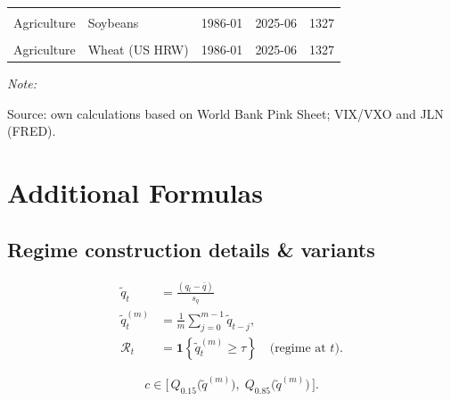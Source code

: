 \documentclass[
  11pt,
]{article}
\begin{document}
\begin{table}[!h]
{\begin{threeparttable}
\begin{tabular}[t]{llllr}
\cellcolor{gray!10}{Agriculture} & \cellcolor{gray!10}{Maize} & \cellcolor{gray!10}{1986-01} & \cellcolor{gray!10}{2025-06} & \cellcolor{gray!10}{1327}\\
\addlinespace
Agriculture & Soybeans & 1986-01 & 2025-06 & 1327\\
\cellcolor{gray!10}{Agriculture} & \cellcolor{gray!10}{Sugar (World)} & \cellcolor{gray!10}{1986-01} & \cellcolor{gray!10}{2025-06} & \cellcolor{gray!10}{1327}\\
Agriculture & Wheat (US HRW) & 1986-01 & 2025-06 & 1327\\
\bottomrule
\end{tabular}
\begin{tablenotes}
\item \textit{Note: } 
\item Source: own calculations based on World Bank Pink Sheet; VIX/VXO and JLN (FRED).
\end{tablenotes}
\end{threeparttable}}
\end{table}

\FloatBarrier
\clearpage

\section{Additional Formulas}\label{app-formulas}

\subsection{Regime construction details \& variants}\label{regime-construction-details-variants}

\begin{subequations}\label{eq:tilde-q-t-2}
\begin{align}
\tilde{q}_t &= \frac{(q_t - \bar{q})}{s_q}\, \label{eq:tilde-q-level-2}\\
\tilde{q}_t^{(m)} &= \frac{1}{m}\sum_{j=0}^{m-1}\tilde{q}_{t-j}, \label{eq:tilde-q-smooth-2}\\
\mathcal{R}_t &= \mathbf{1}\!\left\{ \tilde{q}_t^{(m)} \ge \tau \right\} \quad \text{(regime at $t$)}. \label{eq:tilde-q-regime-2}
\end{align}
\end{subequations}

\begin{equation}\label{eq:c-in}
c \in \bigl[\, Q_{0.15}\!\bigl(\tilde{q}^{(m)}\bigr),\; Q_{0.85}\!\bigl(\tilde{q}^{(m)}\bigr) \,\bigr].
\end{equation}
\end{document}
